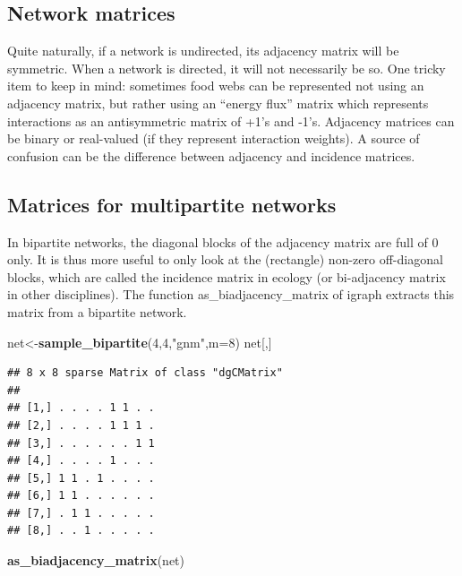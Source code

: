 \documentclass[
]{book}
\newenvironment{Shaded}{\begin{snugshade}}{\end{snugshade}}
\newcommand{\AttributeTok}[1]{\textcolor[rgb]{0.13,0.29,0.53}{#1}}
\newcommand{\DecValTok}[1]{\textcolor[rgb]{0.00,0.00,0.81}{#1}}
\newcommand{\FunctionTok}[1]{\textcolor[rgb]{0.13,0.29,0.53}{\textbf{#1}}}
\newcommand{\NormalTok}[1]{#1}
\newcommand{\OtherTok}[1]{\textcolor[rgb]{0.56,0.35,0.01}{#1}}
\newcommand{\StringTok}[1]{\textcolor[rgb]{0.31,0.60,0.02}{#1}}
\theoremstyle{definition}
\theoremstyle{definition}
\theoremstyle{definition}
\theoremstyle{definition}
\theoremstyle{remark}
\begin{document}
\subsection{Network matrices}\label{network-matrices}

Quite naturally, if a network is undirected, its adjacency matrix will be symmetric. When a network is directed, it will not necessarily be so.
One tricky item to keep in mind: sometimes food webs can be represented not using an adjacency matrix, but rather using an ``energy flux'' matrix which represents interactions as an antisymmetric matrix of +1's and -1's.
Adjacency matrices can be binary or real-valued (if they represent interaction weights).
A source of confusion can be the difference between adjacency and incidence matrices.

\subsection{Matrices for multipartite networks}\label{matrices-for-multipartite-networks}

In bipartite networks, the diagonal blocks of the adjacency matrix are full of 0 only. It is thus more useful to only look at the (rectangle) non-zero off-diagonal blocks, which are called the incidence matrix in ecology (or bi-adjacency matrix in other disciplines).
The function as\_biadjacency\_matrix of igraph extracts this matrix from a bipartite network.

\begin{Shaded}
\begin{Highlighting}[]
\NormalTok{net}\OtherTok{\textless{}{-}}\FunctionTok{sample\_bipartite}\NormalTok{(}\DecValTok{4}\NormalTok{,}\DecValTok{4}\NormalTok{,}\StringTok{"gnm"}\NormalTok{,}\AttributeTok{m=}\DecValTok{8}\NormalTok{)}
\NormalTok{net[,]}
\end{Highlighting}
\end{Shaded}

\begin{verbatim}
## 8 x 8 sparse Matrix of class "dgCMatrix"
##                     
## [1,] . . . . 1 1 . .
## [2,] . . . . 1 1 1 .
## [3,] . . . . . . 1 1
## [4,] . . . . 1 . . .
## [5,] 1 1 . 1 . . . .
## [6,] 1 1 . . . . . .
## [7,] . 1 1 . . . . .
## [8,] . . 1 . . . . .
\end{verbatim}

\begin{Shaded}
\begin{Highlighting}[]
\FunctionTok{as\_biadjacency\_matrix}\NormalTok{(net)}
\end{Highlighting}
\end{Shaded}
\end{document}
